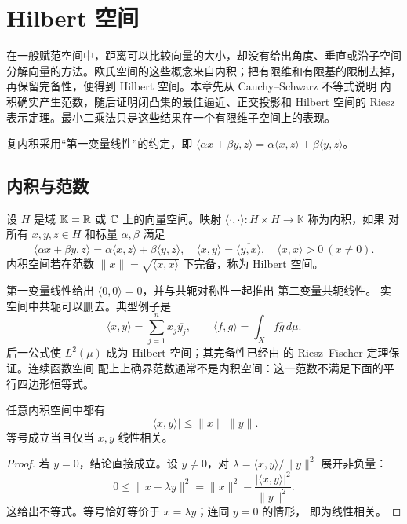 \chapter{Hilbert 空间}
\label{chap:hilbert-spaces}

在一般赋范空间中，距离可以比较向量的大小，却没有给出角度、垂直或沿子空间
分解向量的方法。欧氏空间的这些概念来自内积；把有限维和有限基的限制去掉，
再保留完备性，便得到 Hilbert 空间。本章先从 Cauchy--Schwarz 不等式说明
内积确实产生范数，随后证明闭凸集的最佳逼近、正交投影和 Hilbert 空间的
Riesz 表示定理。最小二乘法只是这些结果在一个有限维子空间上的表现。

复内积采用“第一变量线性”的约定，即
\(\langle \alpha x+\beta y,z\rangle
=\alpha\langle x,z\rangle+\beta\langle y,z\rangle\)。

\section{内积与范数}

\begin{definition}
设 \(H\) 是域 \(\mathbb K=\mathbb{R}\) 或 \(\mathbb{C}\) 上的向量空间。映射
\(\langle\cdot,\cdot\rangle:H\times H\to\mathbb K\) 称为内积，如果
对所有 \(x,y,z\in H\) 和标量 \(\alpha,\beta\) 满足
\[
 \langle \alpha x+\beta y,z\rangle
 =\alpha\langle x,z\rangle+\beta\langle y,z\rangle,
 \quad \langle x,y\rangle=\overline{\langle y,x\rangle},
 \quad \langle x,x\rangle>0\ (x\ne0).
\]
内积空间若在范数 \(\|x\|=\sqrt{\langle x,x\rangle}\) 下完备，称为
Hilbert 空间。
\end{definition}

第一变量线性给出 \(\langle0,0\rangle=0\)，并与共轭对称性一起推出
第二变量共轭线性。
实空间中共轭可以删去。典型例子是
\[
 \langle x,y\rangle=\sum_{j=1}^n x_j\overline{y_j},\qquad
 \langle f,g\rangle=\int_X f\overline g\,d\mu.
\]
后一公式使 \(L^2(\mu)\) 成为 Hilbert 空间；其完备性已经由
的 Riesz--Fischer 定理保证。连续函数空间
配上上确界范数通常不是内积空间：这一范数不满足下面的平行四边形恒等式。

\begin{theorem}\label{thm:hilbert-cauchy-schwarz}
任意内积空间中都有
\[
 |\langle x,y\rangle|\le \|x\|\,\|y\|.
\]
等号成立当且仅当 \(x,y\) 线性相关。
\end{theorem}
\begin{proof}
若 \(y=0\)，结论直接成立。设 \(y\ne0\)，对
\(\lambda=\langle x,y\rangle/\|y\|^2\) 展开非负量：
\[
 0\le\|x-\lambda y\|^2
 =\|x\|^2-\frac{|\langle x,y\rangle|^2}{\|y\|^2}.
\]
这给出不等式。等号恰好等价于 \(x=\lambda y\)；连同 \(y=0\) 的情形，
即为线性相关。
\end{proof}

